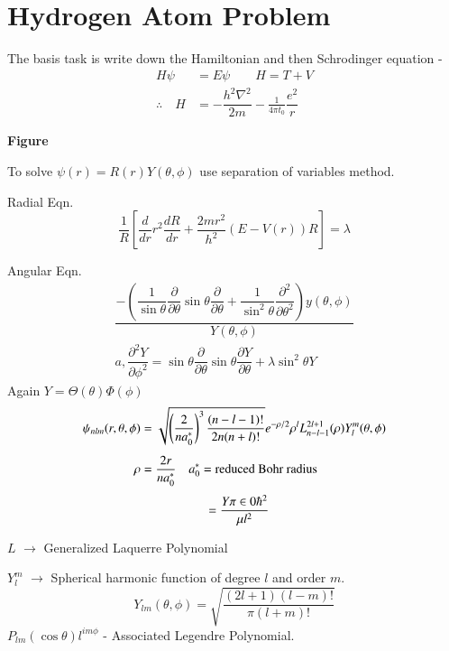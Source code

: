 \section*{Hydrogen Atom Problem}

The basis task is write down the Hamiltonian and then Schrodinger equation -
\begin{align*}
H\psi &= E\psi\qquad H = T+V\\[4pt]
\therefore\quad H &= -\dfrac{h^{2}\nabla^{2}}{2m}-\frac{1}{4\pi t_{0}}\dfrac{e^{2}}{r}
\end{align*}
\begin{center}
{\bf Figure}
\end{center}

To solve $\psi(r)=R(r)Y(\theta,\phi)$ use separation of variables method.

Radial Eqn.
$$
\dfrac{1}{R}\left[\dfrac{d}{dr}r^{2}\dfrac{dR}{dr}+\dfrac{2mr^{2}}{h^{2}}(E-V(r))R\right]=\lambda
$$

Angular Eqn.
\begin{gather*}
\dfrac{-\left(\dfrac{1}{\sin\theta}\dfrac{\partial}{\partial\theta}\sin\theta\dfrac{\partial}{\partial\theta}+\dfrac{1}{\sin^{2}\theta}\dfrac{\partial^{2}}{\partial\theta^{2}}\right)y(\theta,\phi)}{Y(\theta,\phi)}\\
a, \dfrac{\partial^{2}Y}{\partial \phi^{2}}=\sin\theta\dfrac{\partial}{\partial\theta}\sin\theta\dfrac{\partial Y}{\partial\theta}+\lambda\sin^{2}\theta Y
\end{gather*}
Again $Y=\Theta(\theta)\Phi (\phi)$
\begin{align*}
\psi_{nlm}(r,\theta,\phi) &= \sqrt{\left(\dfrac{2}{na^{*}_{0}}\right)^{3}\dfrac{(n-l-1)!}{2n(n+l)!}}e^{-\rho/2}\rho^{l}L^{2l+1}_{n-l-1}(\rho)Y^{m}_{l}(\theta,\phi)\\[4pt]
\rho &= \dfrac{2r}{na^{*}_{0}}\quad a^{*}_{0} = \text{reduced Bohr radius}\\[3pt]
&\hspace{1.8cm} = \dfrac{Y\pi\in 0 \hbar^{2}}{\mu l^{2}}
\end{align*}

$L$ $\to$ Generalized Laquerre Polynomial

$Y^{m}_{l}$ $\to$ Spherical harmonic function of degree $l$ and order $m$.
$$
Y_{lm}(\theta,\phi)=\sqrt{\dfrac{(2l+1)(l-m)!}{\pi(l+m)!}}
$$ 
$P_{lm}(\cos\theta)l^{im\phi}$ - Associated Legendre Polynomial.

